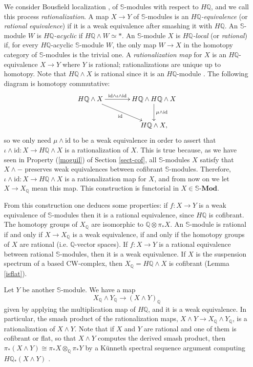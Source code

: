 \documentclass[a4paper,11pt]{amsart} %
\theoremstyle{definition} \newtheorem{defn}[equation]{Definition}
\theoremstyle{remark} \newtheorem{notation}[equation]{Notation}
\theoremstyle{plain} \newtheorem{teo}[equation]{Theorem}
\theoremstyle{plain} \newtheorem{lema}[equation]{Lemma}
\theoremstyle{plain} \newtheorem{prop}[equation]{Proposition}
\theoremstyle{plain} \newtheorem{corolario}[equation]{Corollary}
\theoremstyle{remark} \newtheorem{obs}[equation]{Remark}
\theoremstyle{remark} \newtheorem{sideobs}[equation]{Side remark}
\theoremstyle{remark} \newtheorem{ejercicio}[equation]{Exercise}
\theoremstyle{definition} \newtheorem{notn}[equation]{Notation}
\theoremstyle{remark} \newtheorem{ej}[equation]{Example}
\theoremstyle{remark} \newtheorem{contraej}[equation]{Counterexample}
\theoremstyle{plain} \newtheorem{conj}[equation]{Conjecture}
\renewcommand{\1}{\ensuremath{\mathbbm{1}}}
\newcommand{\Q}{\mathbb{Q}}
\renewcommand{\S}{\mathbb{S}}
\newcommand{\id}{\mathrm{id}}
\newcommand{\SMod}{\ensuremath{\mathbb{S}}\mbox{-}\ensuremath{\textbf{Mod}}}
\numberwithin{equation}{section}
\begin{document}
We consider Bousfield localization \cite[VIII.1]{ekmm}, \cite[19.2]{mayponto} of $\S$-modules with respect to $H\Q$, and we call this process \emph{rationalization}. A map $X\to Y$ of $\S$-modules is an \emph{$H\Q$-equivalence} (or \emph{rational equivalence}) if it is a weak equivalence after smashing it with $H\Q$. An $\S$-module $W$ is \emph{$H\Q$-acyclic} if $H\Q \wedge W\simeq *$. An $\S$-module $X$ is \emph{$H\Q$-local} (or \emph{rational}) if, for every $H\Q$-acyclic $\S$-module $W$, the only map $W\to X$ in the homotopy category of $\S$-modules is the trivial one. A \emph{rationalization map} for $X$ is an $H\Q$-equivalence $X\to Y$ where $Y$ is rational; rationalizations are unique up to homotopy. %
%
%
%
Note that $H\Q\wedge X$ is rational since it is an $H\Q$-module \cite[1.17]{ravenel-loc}. %
The following diagram is homotopy commutative:
\[\xymatrix@C+1pc{H\Q\wedge X \ar[r]^-{\id\wedge \iota \wedge \id} \ar[rd]_-{\id} & H\Q \wedge H\Q \wedge X\ar[d]^-{\mu \wedge \id} \\ & H\Q \wedge X,}\]
so we only need $\mu\wedge \id$ to be a weak equivalence in order to assert that $\iota \wedge \id: X\to H\Q \wedge X$ is a rationalization of $X$. This is true because, as we have seen in Property (\ref{moguil}) of Section \ref{sect-cof}, all $\S$-modules $X$ satisfy that $X\wedge -$ preserves weak equivalences between cofibrant $\S$-modules. Therefore, $\iota \wedge \id: X\to H\Q\wedge X$ is a rationalization map for $X$, and from now on we let $X\to X_\Q$ mean this map. This construction is functorial in $X\in\SMod$. %

From this construction one deduces some properties: if $f:X\to Y$ is a weak equivalence of $\S$-modules then it is a rational equivalence, since $H\Q$ is cofibrant. The homotopy groups of $X_\Q$ are isomorphic to $\Q \otimes \pi_*X$. %
An $\S$-module is rational if and only if $X\to X_\Q$ is a weak equivalence, 
%
if and only if the homotopy groups of $X$ are rational (i.e. $\Q$-vector spaces). %
If $f:X\to Y$ is a rational equivalence between rational $\S$-modules, then it is a weak equivalence.  %
If $X$ is the suspension spectrum of a based CW-complex, then $X_\Q=H\Q\wedge X$ is cofibrant (Lemma \ref{isflat}).

Let $Y$ be another $\S$-module. 
%
%
%
%
%
We have a map \[X_\Q \wedge Y_\Q \to (X\wedge Y)_\Q\] given by applying the multiplication map of $H\Q$, and it is a weak equivalence. 
In particular, the smash product of the rationalization maps, $X\wedge Y \to X_\Q \wedge Y_\Q$, is a rationalization of $X\wedge Y$. Note that if $X$ and $Y$ are rational and one of them is cofibrant or flat, so that $X\wedge Y$ computes the derived smash product,
 then $\pi_*(X \wedge Y)\cong \pi_*X \otimes_\Q \pi_*Y$ by a Künneth spectral sequence argument computing $H\Q_*(X\wedge Y)$ \cite[IV.4.7]{ekmm}. %
\end{document}
